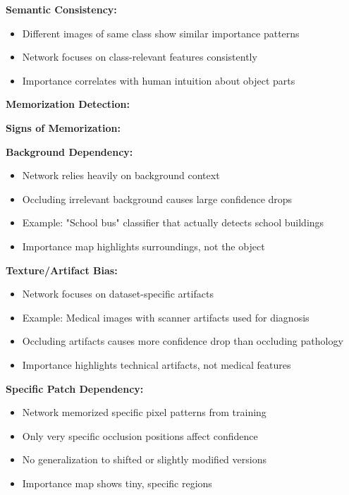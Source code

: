 \documentclass[12pt]{article}
\newcommand{\explanation}[1]{{\color{explanationcolor}#1}}
\begin{document}
\begin{enumerate}[(a)]
{{    \textbf{Semantic Consistency:}
    \begin{itemize}
        \item Different images of same class show similar importance patterns
        \item Network focuses on class-relevant features consistently
        \item Importance correlates with human intuition about object parts
    \end{itemize}
    }
    
    \textbf{Memorization Detection:}
    
    \explanation{
    \textbf{Signs of Memorization:}
    
    \textbf{Background Dependency:}
    \begin{itemize}
        \item Network relies heavily on background context
        \item Occluding irrelevant background causes large confidence drops
        \item Example: "School bus" classifier that actually detects school buildings
        \item Importance map highlights surroundings, not the object
    \end{itemize}
    
    \textbf{Texture/Artifact Bias:}
    \begin{itemize}
        \item Network focuses on dataset-specific artifacts
        \item Example: Medical images with scanner artifacts used for diagnosis
        \item Occluding artifacts causes more confidence drop than occluding pathology
        \item Importance highlights technical artifacts, not medical features
    \end{itemize}
    
    \textbf{Specific Patch Dependency:}
    \begin{itemize}
        \item Network memorized specific pixel patterns from training
        \item Only very specific occlusion positions affect confidence
        \item No generalization to shifted or slightly modified versions
        \item Importance map shows tiny, specific regions
    \end{itemize}
    }
    
}
\end{enumerate}
\end{document}
